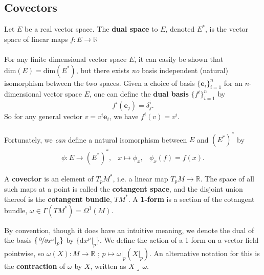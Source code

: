 \documentclass[11pt,fleqn]{report}
\newcommand{\contract}{\boldsymbol{\lrcorner}\, }
\begin{document}
\subsection{Covectors}

\begin{definition}
Let $E$ be a real vector space. The \textbf{dual space} to $E$, denoted $E^*$, is the vector space of linear maps $f:E\to\mathbb{R}$
\end{definition}

\paragraph{}For any finite dimensional vector space $E$, it can easily be shown that $\textrm{dim}(E) = \textrm{dim}(E^*) $, but there exists \textit{no} basis independent (natural) isomorphism between the two spaces. Given a choice of basis $\{\mathbf{e}_i\}_{i=1}^{n}$ for an $n$-dimensional vector space $E$, one can define the \textbf{dual basis} $\{f^i\}_{i=1}^n$ by \begin{equation}
f^i(\mathbf{e}_j) = \delta^i_j.
\end{equation}
So for any general vector $v =  v^i \mathbf{e}_i$, we have $f^i(v) = v^i$.

\paragraph{}Fortunately, we \textit{can} define a natural isomorphism between $E$ and $\left(E^*\right)^*$ by \begin{eqnarray}
\phi : E \to \left(E^*\right)^*, & x \mapsto \phi_x ,& \phi_x(f) = f(x).
\end{eqnarray}

\begin{definition}
A  \textbf{covector} is an element of $T_pM^*$, i.e. a linear map $T_pM \to \mathbb{R}$. The space of all such maps at a point is called the \textbf{cotangent space}, and the disjoint union thereof is the \textbf{cotangent bundle}, $TM^*$. A \textbf{1-form} is a section of the cotangent bundle, $\omega \in \Gamma\left(TM^*\right) = \Omega^1(M)$.
\end{definition}

By convention, though it does have an intuitive meaning, we denote the dual of the basis $\{\left.\nicefrac{\partial}{\partial x^\mu}\right\vert_p \}$ by $\{\mathrm{d}x^\mu|_p\}$. We define the action of a 1-form on a vector field pointwise, so $\omega(X) : M \to \mathbb{R}$ ; $p \mapsto \omega|_p\left(X|_p\right)$. An alternative notation for this is the \textbf{contraction} of $\omega$ by $X$, written as $X \contract \omega$.
\end{document}
